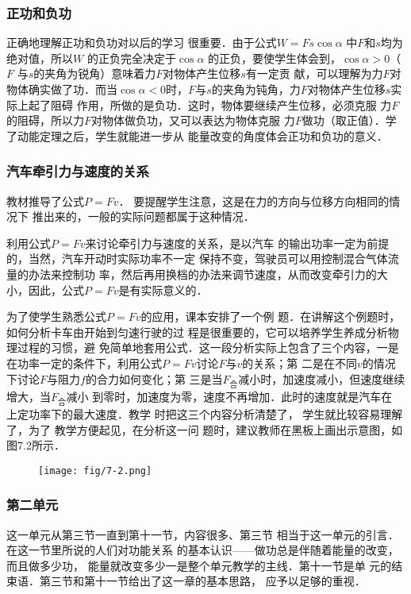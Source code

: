 \subsubsection{正功和负功}

正确地理解正功和负功对以后的学习
很重要．由于公式$W=Fs\cos\alpha$ 中$F$和$s$均为绝对值，所以$W$
的正负完全决定于$\cos\alpha$ 的正负，要使学生体会到，$\cos\alpha >0$（$F$
与$s$的夹角为锐角）意味着力$F$对物体产生位移$s$有一定贡
献，可以理解为力$F$对物体确实做了功．而当$\cos\alpha <0$时，$F
$与$s$的夹角为钝角，力$F$对物体产生位移$s$实际上起了阻碍
作用，所做的是负功．这时，物体要继续产生位移，必须克服
力$F$的阻碍，所以力$F$对物体做负功，又可以表达为物体克服
力$F$做功（取正值）．学了动能定理之后，学生就能进一步从
能量改变的角度体会正功和负功的意义．

\subsubsection{汽车牵引力与速度的关系}

教材推导了公式$P=Fv$．
要提醒学生注意，这是在力的方向与位移方向相同的情况下
推出来的，一般的实际问题都属于这种情况．

利用公式$P=Fv$来讨论牵引力与速度的关系，是以汽车
的输出功率一定为前提的，当然，汽车开动时实际功率不一定
保持不变，驾驶员可以用控制混合气体流量的办法来控制功
率，然后再用换档的办法来调节速度，从而改变牵引力的大
小，因此，公式$P=Fv$是有实际意义的．

为了使学生熟悉公式$P=Fv$的应用，课本安排了一个例
题．在讲解这个例题时，如何分析卡车由开始到匀速行驶的过
程是很重要的，它可以培养学生养成分析物理过程的习惯，避
免简单地套用公式．这一段分析实际上包含了三个内容，一是
在功率一定的条件下，利用公式$P=Fv$讨论$F$与$v$的关系；第
二是在不同$v$的情况下讨论$F$与阻力$f$的合力如何变化；第
三是当$F_{\text{合}}$减小时，加速度减小，但速度继续增大，当$F_{\text{合}}$减小
到零时，加速度为零，速度不再增加．此时的速度就是汽车在
上定功率下的最大速度．教学
时把这三个内容分析清楚了，
学生就比较容易理解了，为了
教学方便起见，在分析这一问
题时，建议教师在黑板上画出示意图，如图7.2所示．
\begin{figure}[htp]
    \centering
    \texttt{[image: fig/7-2.png]}
    \caption{}
\end{figure}


\subsubsection{第二单元}
这一单元从第三节一直到第十一节，内容很多、第三节
相当于这一单元的引言．在这一节里所说的人们对功能关系
的基本认识——做功总是伴随着能量的改变，而且做多少功，
能量就改变多少一是整个单元教学的主线．第十一节是单
元的结束语．第三节和第十一节给出了这一章的基本思路，
应予以足够的重视．

